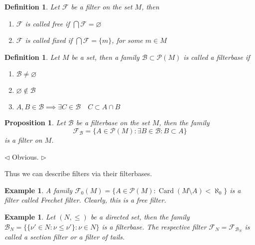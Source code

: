 \documentclass[12pt]{article}
\newtheorem{proposition}[theorem]{Proposition}
\newtheorem{definition}[theorem]{Definition}
\newtheorem{example}[theorem]{Example}
\newenvironment{proof}{\par $\triangleleft$}{$\triangleright$}
\begin{document}
\begin{definition}\label{DefFilterTypes} Let $\mathcal{F}$ be a filter on the
    set $M$, then
    \begin{enumerate}[label = (\roman*)]
        \item $\mathcal{F}$ is called free if $\bigcap\mathcal{F}=\varnothing$
        \item $\mathcal{F}$ is called fixed if $\bigcap\mathcal{F}=\{m\}$, for
              some $m\in M$
    \end{enumerate}
\end{definition}

\begin{definition}\label{DefFilterBase} Let $M$ be a set, then a family
    $\mathcal{B}\subset\mathcal{P}(M)$ is called a filterbase if
    \begin{enumerate}[label = (\roman*)]
        \item $\mathcal{B}\neq\varnothing$
        \item $\varnothing\notin\mathcal{B}$
        \item $A,B\in\mathcal{B}\implies \exists C\in\mathcal{B}\quad C\subset
                  A\cap B$
    \end{enumerate}
\end{definition}

\begin{proposition}\label{PrFilterFromFilterBase} Let $\mathcal{B}$ be a
    filterbase on the set $M$, then the family
    $$
        \mathcal{F}_{\mathcal{B}}=
        \{A\in\mathcal{P}(M):\exists B\in\mathcal{B}: B\subset A\}
    $$
    is a filter on $M$.
\end{proposition}
\begin{proof} Obvious.
\end{proof}

Thus we can describe filters via their filterbases.

\begin{example}\label{ExFrechetFilter} A family
    $\mathcal{F}_0(M)=\{A\in\mathcal{P}(M):\operatorname{Card}(M\setminus
        A)<\aleph_0\}$ is a filter called Frechet filter. Clearly, this is a free
    filter.
\end{example}

\begin{example}\label{ExSectionFilter} Let $(N,\leq )$ be a directed set, then
    the family $\mathcal{B}_N=\{ \{\nu'\in N:\nu\leq\nu'\}:\nu\in N\}$ is a
    filterbase. The respective filter
    $\mathcal{F}_N=\mathcal{F}_{\mathcal{B}_N}$ is called a section filter or a
    filter of tails.
\end{example}
\end{document}
